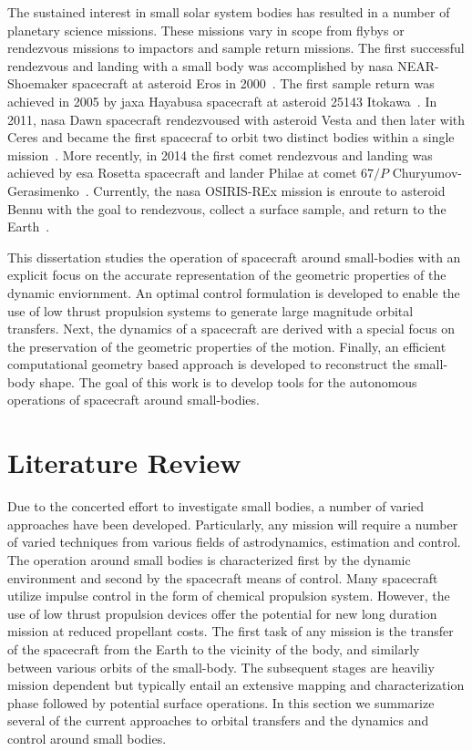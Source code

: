 The sustained interest in small solar system bodies has resulted in a number of planetary science missions.
These missions vary in scope from flybys or rendezvous missions to impactors and sample return missions. 
The first successful rendezvous and landing with a small body was accomplished by \gls{nasa} NEAR-Shoemaker spacecraft at asteroid Eros in \num{2000}~\cite{miller2002}.
The first sample return was achieved in \num{2005} by \gls{jaxa} Hayabusa spacecraft at asteroid \num{25143} Itokawa~\cite{yoshimitsu2009}.
In \num{2011}, \gls{nasa} Dawn spacecraft rendezvoused with asteroid  Vesta and then later with Ceres and became the first spacecraf to orbit two distinct bodies within a single mission~\cite{rayman2006}.
More recently, in \num{2014} the first comet rendezvous and landing was achieved by \gls{esa} Rosetta spacecraft and lander Philae at comet \(67/P\) Churyumov-Gerasimenko~\cite{bibring2015}.
Currently, the \gls{nasa} OSIRIS-REx mission is enroute to asteroid Bennu with the goal to rendezvous, collect a surface sample, and return to the Earth~\cite{beshore2015}.

This dissertation studies the operation of spacecraft around small-bodies with an explicit focus on the accurate representation of the geometric properties of the dynamic enviornment.
An optimal control formulation is developed to enable the use of low thrust propulsion systems to generate large magnitude orbital transfers.
Next, the dynamics of a spacecraft are derived with a special focus on the preservation of the geometric properties of the motion.
Finally, an efficient computational geometry based approach is developed to reconstruct the small-body shape.
The goal of this work is to develop tools for the autonomous operations of spacecraft around small-bodies.

\section{Literature Review}

Due to the concerted effort to investigate small bodies, a number of varied approaches have been developed.
Particularly, any mission will require a number of varied techniques from various fields of astrodynamics, estimation and control. 
The operation around small bodies is characterized first by the dynamic environment and second by the spacecraft means of control. 
Many spacecraft utilize impulse control in the form of chemical propulsion system.
However, the use of low thrust propulsion devices offer the potential for new long duration mission at reduced propellant costs.
The first task of any mission is the transfer of the spacecraft from the Earth to the vicinity of the body, and similarly between various orbits of the small-body. 
The subsequent stages are heaviliy mission dependent but typically entail an extensive mapping and characterization phase followed by potential surface operations.
In this section we summarize several of the current approaches to orbital transfers and the dynamics and  control around small bodies.

